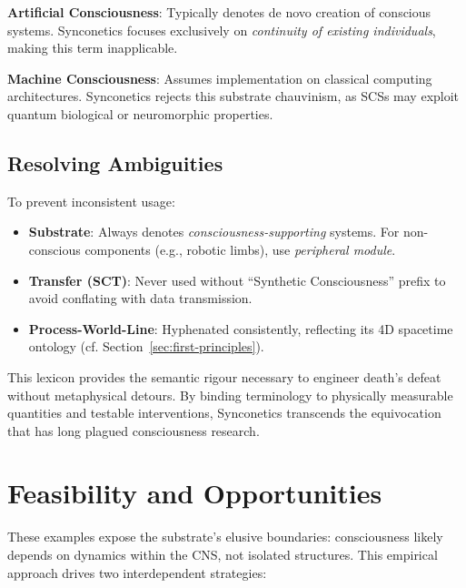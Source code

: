 \documentclass[10pt]{article}
\begin{document}
\begin{sloppypar}
  \textbf{Artificial Consciousness}: Typically denotes de novo creation of conscious systems. Synconetics focuses exclusively on \textit{continuity of existing individuals}, making this term inapplicable.

  \textbf{Machine Consciousness}: Assumes implementation on classical computing architectures. Synconetics rejects this substrate chauvinism, as SCSs may exploit quantum biological or neuromorphic properties.

  \subsection{Resolving Ambiguities}
  To prevent inconsistent usage:
  \begin{itemize}
    \item \textbf{Substrate}: Always denotes \textit{consciousness-supporting} systems. For non-conscious components (e.g., robotic limbs), use \textit{peripheral module}.
    \item \textbf{Transfer (SCT)}: Never used without “Synthetic Consciousness” prefix to avoid conflating with data transmission.
    \item \textbf{Process-World-Line}: Hyphenated consistently, reflecting its 4D spacetime ontology (cf. Section~\ref{sec:first-principles}).
  \end{itemize}

  This lexicon provides the semantic rigour necessary to engineer death’s defeat without metaphysical detours. By binding terminology to physically measurable quantities and testable interventions, Synconetics transcends the equivocation that has long plagued consciousness research.


  \section{Feasibility and Opportunities}
  \label{sec:feasibility}

  These examples expose the substrate’s elusive boundaries: consciousness likely depends on dynamics within the CNS, not isolated structures. This empirical approach drives two interdependent strategies:


\end{sloppypar}
\end{document}
